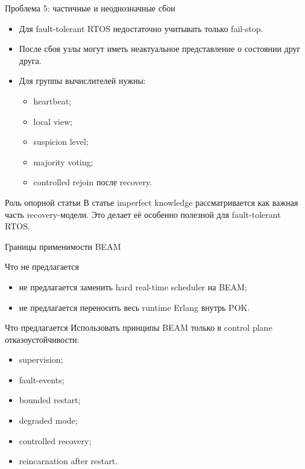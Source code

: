 \documentclass[aspectratio=169]{beamer}
\begin{document}
	\begin{frame}{Проблема 5: частичные и неоднозначные сбои}
		\begin{itemize}
			\item Для fault-tolerant RTOS недостаточно учитывать только fail-stop.
			\item После сбоя узлы могут иметь неактуальное представление о состоянии друг друга.
			\item Для группы вычислителей нужны:
			\begin{itemize}
				\item heartbeat;
				\item local view;
				\item suspicion level;
				\item majority voting;
				\item controlled rejoin после recovery.
			\end{itemize}
		\end{itemize}
		
		\vspace{0.3cm}
		
		\begin{block}{Роль опорной статьи}
			В статье imperfect knowledge рассматривается как важная часть recovery-модели.
			Это делает её особенно полезной для fault-tolerant RTOS.
		\end{block}
	\end{frame}
	
	\begin{frame}{Границы применимости BEAM}
		\begin{block}{Что не предлагается}
			\begin{itemize}
				\item не предлагается заменить hard real-time scheduler на BEAM;
				\item не предлагается переносить весь runtime Erlang внутрь POK.
			\end{itemize}
		\end{block}
		
		\begin{block}{Что предлагается}
			Использовать принципы BEAM только в control plane отказоустойчивости:
			\begin{itemize}
				\item supervision;
				\item fault-events;
				\item bounded restart;
				\item degraded mode;
				\item controlled recovery;
				\item reincarnation after restart.
			\end{itemize}
		\end{block}
	\end{frame}
	
\end{document}
